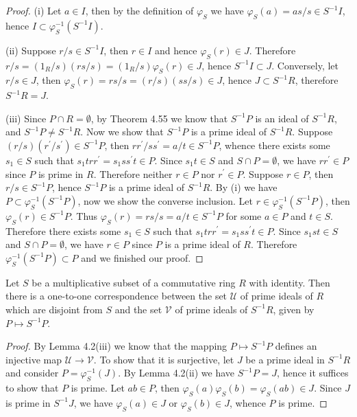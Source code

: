 \begin{proof}
(i) Let $a\in I$, then by the definition of $\varphi_S$ we have $\varphi _S\left( a \right) =as/s\in S^{-1}I$, hence $I\subset\varphi_S^{-1}(S^{-1}I)$.\par
(ii) Suppose $r/s\in S^{-1}I$, then $r\in I$ and hence $\varphi_S(r)\in J$. Therefore $r/s=\left( 1_R/s \right) \left( rs/s \right) =\left( 1_R/s \right) \varphi _S\left( r \right) \in J$, hence $S^{-1}I\subset J$. Conversely, let $r/s\in J$, then $\varphi _S\left( r \right) =rs/s=\left( r/s \right) \left( ss/s \right) \in J$, hence $J\subset S^{-1}R$, therefore $S^{-1}R=J$.\par
(iii) Since $P\cap R=\emptyset$, by Theorem 4.55 we know that $S^{-1}P$ is an ideal of $S^{-1}R$, and $S^{-1}P\ne S^{-1}R$. Now we show that $S^{-1}P$ is a prime ideal of $S^{-1}R$. Suppose $(r/s)(r^\prime/s^\prime)\in S^{-1}P$, then $rr^\prime/ss^\prime=a/t\in S^{-1}P$, whence there exists some $s_1\in S$ such that $s_1trr^\prime=s_1ss^\prime t\in P$. Since $s_1t\in S$ and $S\cap P=\emptyset$, we have $rr^\prime\in P$ since $P$ is prime in $R$. Therefore neither $r\in P$ nor $r^\prime\in P$. Suppose $r\in P$, then $r/s\in S^{-1}P$, hence $S^{-1}P$ is a prime ideal of $S^{-1}R$. By (i) we have $P\subset\varphi_S^{-1}(S^{-1}P)$, now we show the converse inclusion. Let $r\in\varphi_S^{-1}(S^{-1}P)$, then $\varphi_S(r)\in S^{-1}P$. Thus $\varphi_S(r)=rs/s=a/t\in S^{-1}P$ for some $a\in P$ and $t\in S$. Therefore there exists some $s_1\in S$ such that $s_1trr^\prime=s_1ss^\prime t\in P$. Since $s_1st\in S$ and $S\cap P=\emptyset$, we have $r\in P$ since $P$ is a prime ideal of $R$. Therefore $\varphi_S^{-1}(S^{-1}P)\subset P$ and we finished our proof.
\end{proof}
\begin{theorem}
Let $S$ be a multiplicative subset of a commutative ring $R$ with identity. Then there is a one-to-one correspondence between the set $\mathcal{U}$ of prime ideals of $R$ which are disjoint from $S$ and the set $\mathcal{V}$ of prime ideals of $S^{-1}R$, given by $P\mapsto S^{-1}P$.
\end{theorem}
\begin{proof}
By Lemma 4.2(iii) we know that the mapping $P\mapsto S^{-1}P$ defines an injective map $\mathcal{U}\to\mathcal{V}$. To show that it is surjective, let $J$ be a prime ideal in $S^{-1}R$ and consider $P=\varphi_S^{-1}(J)$. By Lemma 4.2(ii) we have $S^{-1}P=J$, hence it suffices to show that $P$ is prime. Let $ab\in P$, then $\varphi_S(a)\varphi_S(b)=\varphi_S(ab)\in J$. Since $J$ is prime in $S^{-1}J$, we have $\varphi_S(a)\in J$ or $\varphi_S(b)\in J$, whence $P$ is prime.
\end{proof}
